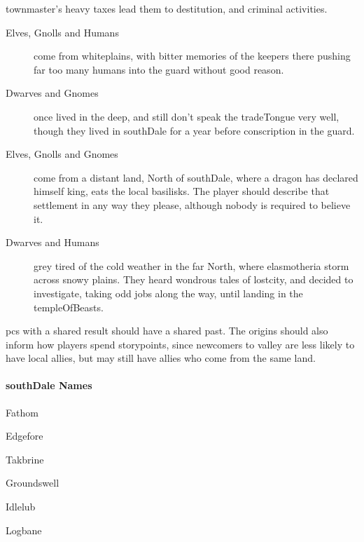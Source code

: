 \begin{multicols}{2}
\begin{dlist}
\begin{description}
    \Gls{townmaster}'s heavy taxes lead them to destitution, and criminal activities.
  \end{description}
  \item
  \begin{description}
    \item[Elves, Gnolls and Humans]
    come from \gls{whiteplains}, with bitter memories of the \glspl{keeper} there pushing far too many humans into the \gls{guard} without good reason.
    \item[Dwarves and Gnomes]
    once lived in the \gls{deep}, and still don't speak the \gls{tradeTongue} very well, though they lived in \gls{southDale} for a year before conscription in the \gls{guard}.
  \end{description}
  \item
  \begin{description}
    \item[Elves, Gnolls and Gnomes]
    come from a distant land, North of \gls{southDale}, where a dragon has declared himself king, eats the local basilisks.
    The player should describe that settlement in any way they please, although nobody is required to believe it.
    \item[Dwarves and Humans]
    grey tired of the cold weather in the far North, where elasmotheria storm across snowy plains.
    They heard wondrous tales of \gls{lostcity}, and decided to investigate, taking odd jobs along the way, until landing in the \gls{templeOfBeasts}.
  \end{description}
\end{dlist}

\Glspl{pc} with a shared result should have a shared past.
The origins should also inform how players spend \glspl{storypoint},%
since newcomers to \gls{valley} are less likely to have local allies, but may still have allies who come from the same land.

\begin{multicols}{2}

\paragraph{\Gls{southDale} Names}

\begin{dlist}
  \item
  Fathom
  \item
  Edgefore
  \item
  Takbrine
  \item
  Groundswell
  \item
  Idlelub
  \item
  Logbane
\end{dlist}


\end{multicols}
\end{multicols}
